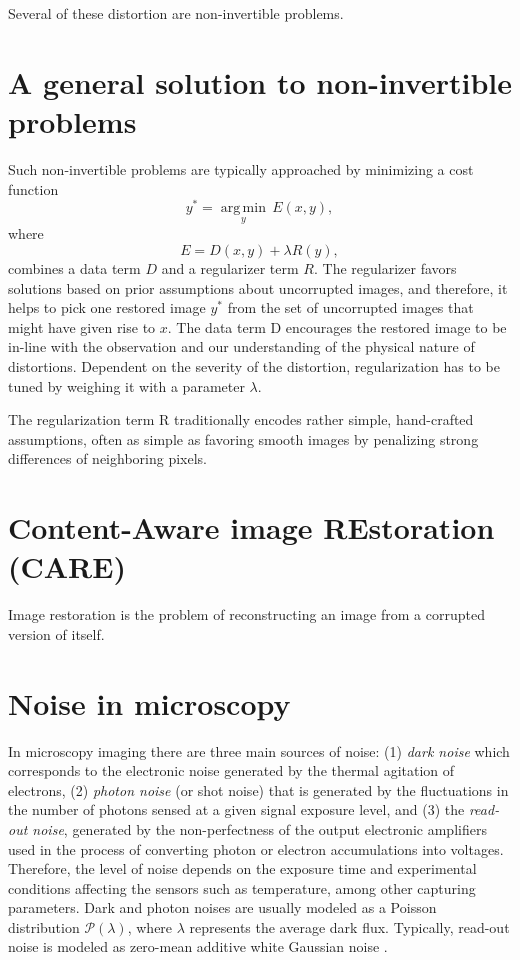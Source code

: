 Several of these distortion are non-invertible problems.

\section{A general solution to non-invertible problems}
Such non-invertible problems are typically approached by minimizing a
cost function
\begin{equation}
y^*=\underset{y}{\operatorname{arg\,min}} \, E(x,y),
\end{equation}
where
\begin{equation}
E = D(x,y) + \lambda R(y),
\end{equation}
combines a data term $D$ and a regularizer term $R$. The regularizer
favors solutions based on prior assumptions about uncorrupted images,
and therefore, it helps to pick one restored image $y^*$ from the set
of uncorrupted images that might have given rise to $x$. The data term
D encourages the restored image to be in-line with the observation and
our understanding of the physical nature of distortions. Dependent on
the severity of the distortion, regularization has to be tuned by
weighing it with a parameter $\lambda$. %

The regularization term R traditionally encodes rather simple,
hand-crafted assumptions, often as simple as favoring smooth images by
penalizing strong differences of neighboring pixels.  %

\section{Content-Aware image REstoration (CARE)}

Image restoration is the problem of reconstructing an image from a corrupted version of itself. %

\section{Noise in microscopy}

In microscopy imaging there are three main sources of noise: (1)
\emph{dark noise} which corresponds to the electronic noise generated
by the thermal agitation of electrons, (2) \emph{photon noise} (or
shot noise) that is generated by the fluctuations in the number of
photons sensed at a given signal exposure level, and (3) the
\emph{read-out noise}, generated by the non-perfectness of the output
electronic amplifiers used in the process of converting photon or
electron accumulations into voltages. Therefore, the level of noise
depends on the exposure time and experimental conditions affecting the
sensors such as temperature, among other capturing parameters. Dark
and photon noises are usually modeled as a Poisson distribution
$\mathcal{P}(\lambda)$, where $\lambda$ represents the average dark
flux. Typically, read-out noise is modeled as zero-mean additive white Gaussian
noise \cite{meiniel2018denoising,zhou2020wirtinger}.

